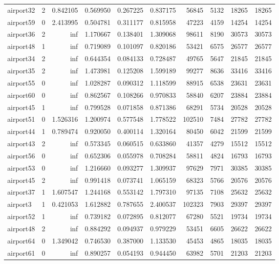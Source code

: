 \begin{longtable}{|l|r|r|r|r|r|r|r|r|r|}
airport32 & 2 & 0.842105 & 0.569950 & 0.267225 & 0.837175 & 56845 & 5132 & 18265 & 18265 \\
airport59 & 0 & 2.413995 & 0.504781 & 0.311177 & 0.815958 & 47223 & 4159 & 14254 & 14254 \\
airport36 & 2 & inf & 1.170667 & 0.138401 & 1.309068 & 98611 & 8190 & 30573 & 30573 \\
airport48 & 1 & inf & 0.719089 & 0.101097 & 0.820186 & 53421 & 6575 & 26577 & 26577 \\
airport34 & 2 & inf & 0.644354 & 0.084133 & 0.728487 & 49765 & 5647 & 21845 & 21845 \\
airport35 & 2 & inf & 1.473981 & 0.125208 & 1.599189 & 99277 & 8636 & 33416 & 33416 \\
airport55 & 0 & inf & 1.028287 & 0.090312 & 1.118599 & 88915 & 6538 & 23631 & 23631 \\
airport60 & 0 & inf & 0.862567 & 0.108266 & 0.970833 & 58840 & 6207 & 23884 & 23884 \\
airport45 & 1 & inf & 0.799528 & 0.071858 & 0.871386 & 68291 & 5734 & 20528 & 20528 \\
airport51 & 0 & 1.526316 & 1.200974 & 0.577548 & 1.778522 & 102510 & 7484 & 27782 & 27782 \\
airport44 & 1 & 0.789474 & 0.920050 & 0.400114 & 1.320164 & 80450 & 6042 & 21599 & 21599 \\
airport43 & 2 & inf & 0.573345 & 0.060515 & 0.633860 & 41357 & 4279 & 15512 & 15512 \\
airport56 & 0 & inf & 0.652306 & 0.055978 & 0.708284 & 58811 & 4824 & 16793 & 16793 \\
airport53 & 0 & inf & 1.216660 & 0.093277 & 1.309937 & 97629 & 7971 & 30385 & 30385 \\
airport45 & 2 & inf & 0.991418 & 0.073741 & 1.065159 & 68323 & 5766 & 20576 & 20576 \\
airport37 & 1 & 1.607547 & 1.244168 & 0.553142 & 1.797310 & 97135 & 7108 & 25632 & 25632 \\
airport3 & 1 & 0.421053 & 1.612882 & 0.787655 & 2.400537 & 102323 & 7903 & 29397 & 29397 \\
airport52 & 1 & inf & 0.739182 & 0.072895 & 0.812077 & 67280 & 5521 & 19734 & 19734 \\
airport48 & 2 & inf & 0.884292 & 0.094937 & 0.979229 & 53451 & 6605 & 26622 & 26622 \\
airport64 & 0 & 1.349042 & 0.746530 & 0.387000 & 1.133530 & 45453 & 4865 & 18035 & 18035 \\
airport61 & 0 & inf & 0.890257 & 0.054193 & 0.944450 & 63982 & 5701 & 21203 & 21203 \\

\end{longtable}
